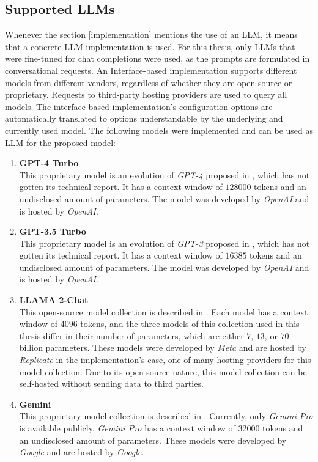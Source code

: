 \documentclass[draft,final]{thesisclass} %
\begin{document}
\subsection{Supported \gls{LLM}s}
Whenever the section \ref{implementation} mentions the use of an \gls{LLM}, it means that a concrete \gls{LLM} implementation is used.
For this thesis, only \gls{LLM}s that were fine-tuned for chat completions were used, as the prompts are formulated in conversational requests.
An Interface-based implementation supports different models from different vendors, regardless of whether they are open-source or proprietary.
Requests to third-party hosting providers are used to query all models. The interface-based implementation's configuration options are automatically translated to options understandable by the underlying and currently used model.
The following models were implemented and can be used as \gls{LLM} for the proposed model:
\begin{enumerate}
    \item \textbf{GPT-4 Turbo}\\
    This proprietary model is an evolution of \textit{GPT-4} proposed in \textcite{gpt4}, which has not gotten its technical report. It has a context window of $128000$ tokens and an undisclosed amount of parameters.
    The model was developed by \textit{OpenAI} and is hosted by \textit{OpenAI}.
    \item \textbf{GPT-3.5 Turbo}\\
    This proprietary model is an evolution of \textit{GPT-3} proposed in \textcite{gpt3}, which has not gotten its technical report. It has a context window of $16385$ tokens and an undisclosed amount of parameters.
    The model was developed by \textit{OpenAI} and is hosted by \textit{OpenAI}.
    \item \textbf{LLAMA 2-Chat}\\
    This open-source model collection is described in \textcite{llama2}. Each model has a context window of $4096$ tokens, and the three models of this collection used in this thesis differ in their number of parameters, which are either $7$, $13$, or $70$ billion parameters.
    These models were developed by \textit{Meta} and are hosted by \textit{Replicate} in the implementation's case, one of many hosting providers for this model collection.
    Due to its open-source nature, this model collection can be self-hosted without sending data to third parties.
    \item \textbf{Gemini}\\
    This proprietary model collection is described in \textcite{gemini}. Currently, only \textit{Gemini Pro} is available publicly. \textit{Gemini Pro} has a context window of $32000$ tokens and an undisclosed amount of parameters.
    These models were developed by \textit{Google} and are hosted by \textit{Google}.
\end{enumerate}
\end{document}
